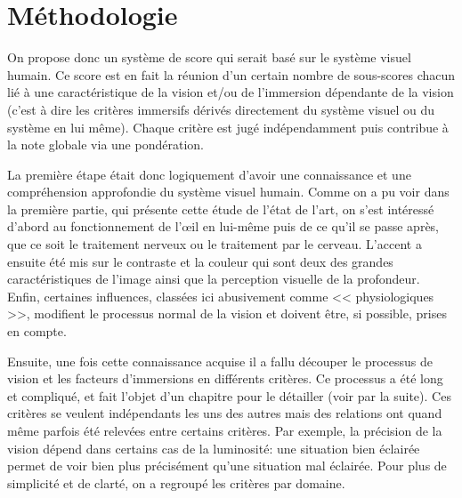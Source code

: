 	\section{Méthodologie}
	\par On propose donc un système de score qui serait basé sur le système visuel humain. Ce score est en fait la réunion d'un certain nombre de sous-scores chacun lié à une caractéristique de la vision et/ou de l'immersion dépendante de la vision (c'est à dire les critères immersifs dérivés directement du système visuel ou du système en lui même). Chaque critère est jugé indépendamment puis contribue à la note globale via une pondération.
	
	\par La première étape était donc logiquement d'avoir une connaissance et une compréhension approfondie du système visuel humain. Comme on a pu voir dans la première partie, qui présente cette étude de l'état de l'art, on s'est intéressé d'abord au fonctionnement de l'œil en lui-même puis de ce qu'il se passe après, que ce soit le traitement nerveux ou le traitement par le cerveau. L'accent a ensuite été mis sur le contraste et la couleur qui sont deux des grandes caractéristiques de l'image ainsi que la perception visuelle de la profondeur. Enfin, certaines influences, classées ici abusivement comme << physiologiques >>, modifient le processus normal de la vision et doivent être, si possible, prises en compte.
	
	\par Ensuite, une fois cette connaissance acquise il a fallu découper le processus de vision et les facteurs d'immersions en différents critères. Ce processus a été long et compliqué, et fait l'objet d'un chapitre pour le détailler (voir par la suite). Ces critères se veulent indépendants les uns des autres mais des relations ont quand même parfois été relevées entre certains critères. Par exemple, la précision de la vision dépend dans certains cas de la luminosité: une situation bien éclairée permet de voir bien plus précisément qu'une situation mal éclairée. Pour plus de simplicité et de clarté, on a regroupé les critères par domaine.
	
